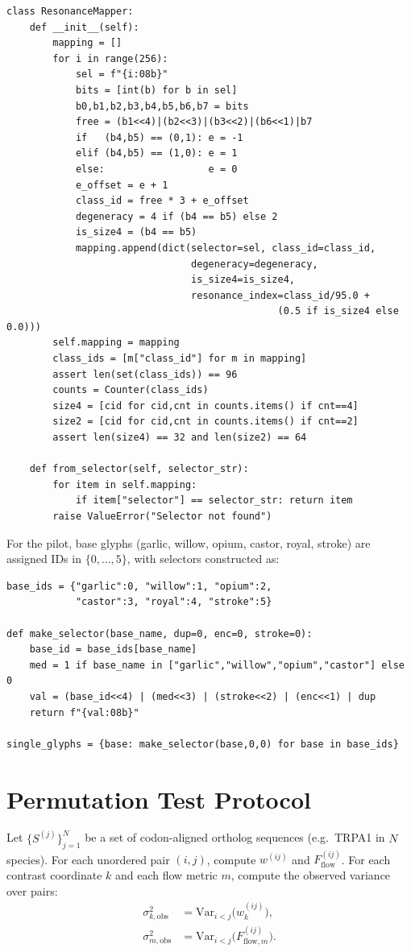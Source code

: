 \documentclass[11pt]{article}
\begin{document}
\begin{verbatim}
class ResonanceMapper:
    def __init__(self):
        mapping = []
        for i in range(256):
            sel = f"{i:08b}"
            bits = [int(b) for b in sel]
            b0,b1,b2,b3,b4,b5,b6,b7 = bits
            free = (b1<<4)|(b2<<3)|(b3<<2)|(b6<<1)|b7
            if   (b4,b5) == (0,1): e = -1
            elif (b4,b5) == (1,0): e = 1
            else:                  e = 0
            e_offset = e + 1
            class_id = free * 3 + e_offset
            degeneracy = 4 if (b4 == b5) else 2
            is_size4 = (b4 == b5)
            mapping.append(dict(selector=sel, class_id=class_id,
                                degeneracy=degeneracy,
                                is_size4=is_size4,
                                resonance_index=class_id/95.0 +
                                               (0.5 if is_size4 else 0.0)))
        self.mapping = mapping
        class_ids = [m["class_id"] for m in mapping]
        assert len(set(class_ids)) == 96
        counts = Counter(class_ids)
        size4 = [cid for cid,cnt in counts.items() if cnt==4]
        size2 = [cid for cid,cnt in counts.items() if cnt==2]
        assert len(size4) == 32 and len(size2) == 64

    def from_selector(self, selector_str):
        for item in self.mapping:
            if item["selector"] == selector_str: return item
        raise ValueError("Selector not found")
\end{verbatim}

For the pilot, base glyphs (garlic, willow, opium, castor, royal, stroke) are assigned IDs in $\{0,\dots,5\}$, with selectors constructed as:
\begin{verbatim}
base_ids = {"garlic":0, "willow":1, "opium":2,
            "castor":3, "royal":4, "stroke":5}

def make_selector(base_name, dup=0, enc=0, stroke=0):
    base_id = base_ids[base_name]
    med = 1 if base_name in ["garlic","willow","opium","castor"] else 0
    val = (base_id<<4) | (med<<3) | (stroke<<2) | (enc<<1) | dup
    return f"{val:08b}"

single_glyphs = {base: make_selector(base,0,0) for base in base_ids}
\end{verbatim}

\section{Permutation Test Protocol}

Let $\{S^{(j)}\}_{j=1}^N$ be a set of codon-aligned ortholog sequences (e.g.\ TRPA1 in $N$ species).\cite{codoncontrast} For each unordered pair $(i,j)$, compute $w^{(ij)}$ and $F_{\text{flow}}^{(ij)}$. For each contrast coordinate $k$ and each flow metric $m$, compute the observed variance over pairs:
\begin{align}
  \sigma^2_{k,\text{obs}} &= \mathrm{Var}_{i<j}\bigl(w^{(ij)}_k\bigr),\\
  \sigma^2_{m,\text{obs}} &= \mathrm{Var}_{i<j}\bigl(F^{(ij)}_{\text{flow},m}\bigr).
\end{align}
\end{document}
